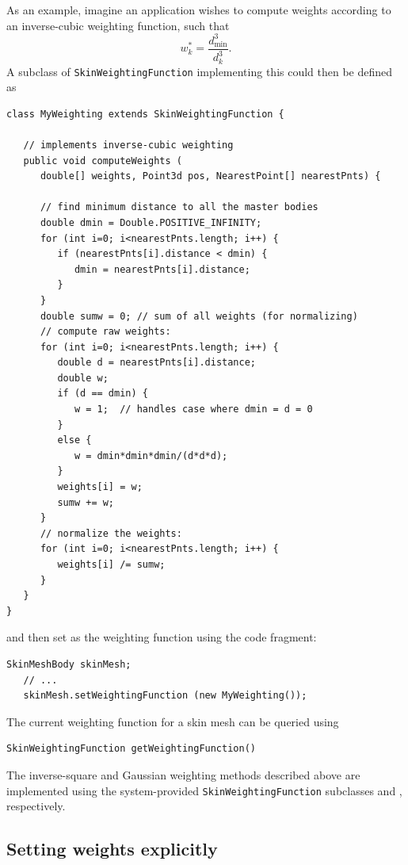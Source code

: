 As an example, imagine an application wishes to compute weights
according to an inverse-cubic weighting function, such that
%
\begin{equation*}
w_k^* = \frac{d_\text{min}^3}{d_k^3}.
\end{equation*}
%
A subclass of {\tt SkinWeightingFunction} implementing this
could then be defined as
%
\begin{lstlisting}[]
class MyWeighting extends SkinWeightingFunction {
      
   // implements inverse-cubic weighting
   public void computeWeights (
      double[] weights, Point3d pos, NearestPoint[] nearestPnts) {

      // find minimum distance to all the master bodies
      double dmin = Double.POSITIVE_INFINITY;
      for (int i=0; i<nearestPnts.length; i++) {
         if (nearestPnts[i].distance < dmin) {
            dmin = nearestPnts[i].distance;
         }
      }
      double sumw = 0; // sum of all weights (for normalizing)
      // compute raw weights:
      for (int i=0; i<nearestPnts.length; i++) {
         double d = nearestPnts[i].distance;
         double w;
         if (d == dmin) {
            w = 1;  // handles case where dmin = d = 0
         }
         else {
            w = dmin*dmin*dmin/(d*d*d);
         }
         weights[i] = w;
         sumw += w;
      }
      // normalize the weights:
      for (int i=0; i<nearestPnts.length; i++) {
         weights[i] /= sumw;
      }
   }
}
\end{lstlisting}
and then set as the weighting function using the code fragment:
%
\begin{lstlisting}[]
   SkinMeshBody skinMesh;
   // ...
   skinMesh.setWeightingFunction (new MyWeighting());
\end{lstlisting}
%

The current weighting function for a skin mesh can be
queried using
%
\begin{lstlisting}[]
   SkinWeightingFunction getWeightingFunction()
\end{lstlisting}
%
The inverse-square and Gaussian weighting methods described above are
implemented using the system-provided {\tt SkinWeightingFunction}
subclasses
 and
, respectively.

\subsection{Setting weights explicitly}

